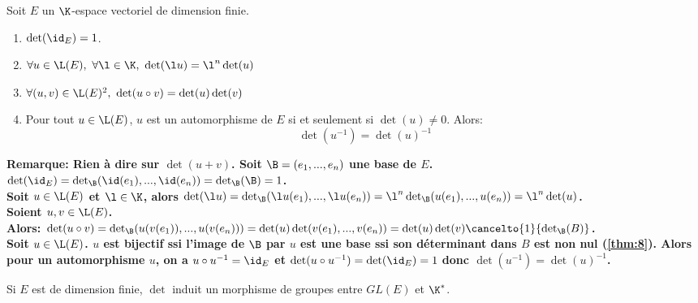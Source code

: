 \documentclass[11pt]{article}
\begin{document}
\begin{prop}{}{}
    Soit $E$ un $\K$-espace vectoriel de dimension finie.
    \begin{enumerate}[topsep=0pt,itemsep=-0.9 ex]
        \item $\det(\id_E)=1$.
        \item $\forall u \in \L(E), ~ \forall \l \in \K, ~ \det(\l u) = \l^n\det(u)$
        \item $\forall (u,v)\in\L(E)^2, ~ \det(u\circ v)=\det(u)\det(v)$
        \item Pour tout $u\in\L(E)$, $u$ est un automorphisme de $E$ si et seulement si $\det(u)\neq 0$. Alors:
        \begin{equation*}
            \det(u^{-1})=\det(u)^{-1}
        \end{equation*}
    \end{enumerate}
    \bf{Remarque:} Rien à dire sur $\det(u+v)$.
    \tcblower
    Soit $\B=(e_1,...,e_n)$ une base de $E$.\\
     $\det(\id_E)=\det_\B(\id(e_1),...,\id(e_n))=\det_\B(\B)=1$.\\
     Soit $u\in\L(E)$ et $\l\in\K$, alors $\det(\l u) = \det_\B(\l u(e_1),...,\l u(e_n))=\l^n\det_\B(u(e_1),...,u(e_n))=\l^n\det(u)$.\\
     Soient $u,v\in\L(E)$.\\
    Alors: $\det(u\circ v) = \det_\B(u(v(e_1)),...,u(v(e_n)))=\det(u)\det(v(e_1),...,v(e_n))=\det(u)\det(v)\cancelto{1}{\det_\B(B)}$.\\
     Soit $u\in\L(E)$. $u$ est bijectif ssi l'image de $\B$ par $u$ est une base ssi son déterminant dans $B$ est non nul (\ref{thm:8}).
    Alors pour un automorphisme $u$, on a $u\circ u^{-1}=\id_E$ et $\det(u\circ u^{-1})=\det(\id_E)=1$ donc $\det(u^{-1})=\det(u)^{-1}$. 
\end{prop}

\begin{corr}{}{}
    Si $E$ est de dimension finie, $\det$ induit un morphisme de groupes entre $GL(E)$ et $\K^*$.
\end{corr}
\end{document}
